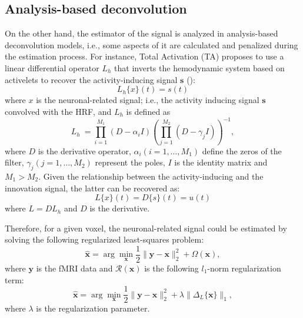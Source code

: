 
\subsection{Analysis-based deconvolution}

On the other hand, the estimator of the signal is analyzed in analysis-based deconvolution models, i.e., some aspects of it are calculated and penalized during the estimation process. For instance, Total Activation (TA) proposes to use a linear differential operator \(L_h\) that inverts the hemodynamic system based on activelets to recover the activity-inducing signal \(\mathbf{s}\) (\citealt{karahanoglu2013TotalActivationFMRI,khalidov2011activelets,karahanoglu2011SignalProcessingApproacha}):
\begin{equation}
    L_h\{x\}(t) = s(t)
\end{equation}
where \(x\) is the neuronal-related signal; i.e., the activity inducing signal \(\mathbf{s}\) convolved with the HRF, and \(L_h\) is defined as
\begin{equation}
    L_h\ = \prod_{i=1}^{M_1} (D-\alpha_i I) (\prod_{j=1}^{M_2} (D - \gamma_j I))^{-1},
\end{equation}
where \(D\) is the derivative operator, \(\alpha_i (i=1, \hdots, M_1)\) define the zeros of the filter, \(\gamma_j (j=1, \hdots, M_2)\) represent the poles, \(I\) is the identity matrix and \(M_1 > M_2\). Given the relationship between the activity-inducing and the innovation signal, the latter can be recovered as:
\begin{equation}
    L\{x\}(t) = D\{s\}(t) = u(t)
\end{equation}
where \(L = DL_h\) and \(D\) is the derivative.

Therefore, for a given voxel, the neuronal-related signal could be estimated by solving the following regularized least-squares problem:
\begin{equation}
    \hat{\mathbf{x}} = \arg \min_{\mathbf{x}} \frac{1}{2} \| \mathbf{y} - \mathbf{x} \|_2^2 + \Omega(\mathbf{x}),
\end{equation}
where \(\mathbf{y}\) is the fMRI data and \(\mathcal{R}(\mathbf{x})\) is the following \(l_1\)-norm regularization term:
\begin{equation}
    \hat{\mathbf{x}} = \arg \min_{\mathbf{x}} \frac{1}{2} \| \mathbf{y} - \mathbf{x} \|_2^2 + \lambda \| \Delta_L \{\mathbf{x}\} \|_1,
\end{equation}
where \(\lambda\) is the regularization parameter.

